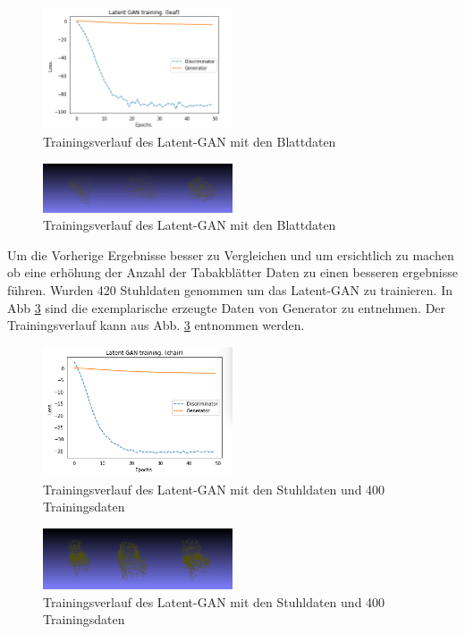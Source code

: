 \documentclass{llncs}
\begin{document}
\begin{figure}[htbp] 
	\centering
	\includegraphics[width=0.5\textwidth]{Latent_gan_training_result.png}
	\caption{Trainingsverlauf des Latent-GAN mit den Blattdaten}
	\label{fig:Bild63}
\end{figure}
\begin{figure}[htbp] 
	\centering
	\includegraphics[width=0.5\textwidth]{latent_gan_leaf_example.png}
	\caption{Trainingsverlauf des Latent-GAN mit den Blattdaten}
	\label{fig:Bild64}
\end{figure}

Um die Vorherige Ergebnisse besser zu Vergleichen und um ersichtlich zu machen ob eine erhöhung der Anzahl der Tabakblätter Daten zu einen besseren ergebnisse führen. Wurden 420 Stuhldaten genommen um das Latent-GAN zu trainieren. In Abb \ref{fig:Bild65} sind die exemplarische erzeugte Daten von Generator zu entnehmen. Der Trainingsverlauf kann aus Abb. \ref{fig:Bild65} entnommen werden. 

\begin{figure}[htbp] 
	\centering
	\includegraphics[width=0.5\textwidth]{raw_gan_latent_gan_chair_result_400_example.png}
	\caption{Trainingsverlauf des Latent-GAN mit den Stuhldaten und 400 Trainingsdaten}
	\label{fig:Bild65}
\end{figure}

\begin{figure}[htbp] 
	\centering
	\includegraphics[width=0.5\textwidth]{raw_gan_latent_gan_chair_example_400.png}
	\caption{Trainingsverlauf des Latent-GAN mit den Stuhldaten und 400 Trainingsdaten}
	\label{fig:Bild66}
\end{figure}
\end{document}
